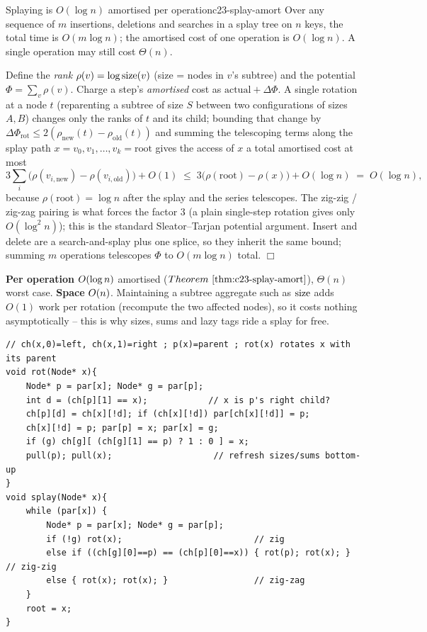 \begin{theorem}{Splaying is \(O(\log n)\) amortised per operation}{c23-splay-amort}
Over any sequence of \(m\) insertions, deletions and searches in a splay tree on
\(n\) keys, the total time is \(O(m\log n)\); the amortised cost of one operation
is \(O(\log n)\). A single operation may still cost \(\Theta(n)\).
\end{theorem}
\begin{proofbox}
Define the \emph{rank} \(\rho(v)=\log \operatorname{size}(v)\) (size = nodes in \(v\)'s subtree)
and the potential \(\Phi=\sum_{v}\rho(v)\). Charge a step's \emph{amortised} cost as
\(\text{actual} + \Delta\Phi\). A single rotation at a node \(t\) (reparenting a
subtree of size \(S\) between two configurations of sizes \(A,B\)) changes only the
ranks of \(t\) and its child; bounding that change by \(\Delta\Phi_{\text{rot}}\le
2(\rho_{\text{new}}(t)-\rho_{\text{old}}(t))\) and summing the telescoping terms
along the splay path \(x=v_0,v_1,\dots,v_k=\text{root}\) gives the access of \(x\) a
total amortised cost at most
\[
  3\sum_{i}\bigl(\rho(v_{i,\text{new}})-\rho(v_{i,\text{old}})\bigr) + O(1)
  \;\le\; 3\bigl(\rho(\text{root})-\rho(x)\bigr) + O(\log n) \;=\; O(\log n),
\]
because \(\rho(\text{root})=\log n\) after the splay and the series telescopes. The
zig-zig / zig-zag pairing is what forces the factor \(3\) (a plain single-step
rotation gives only \(O(\log^2 n)\)); this is the standard Sleator--Tarjan
potential argument. Insert and delete are a search-and-splay plus one splice, so
they inherit the same bound; summing \(m\) operations telescopes \(\Phi\) to
\(O(m\log n)\) total. \(\Box\)
\end{proofbox}

\begin{complexitybox}
\textbf{Per operation} \(O(\log n)\) amortised (\(\thmref{c23-splay-amort}\)),
\(\Theta(n)\) worst case. \textbf{Space} \(O(n)\). Maintaining a subtree
aggregate such as \(\operatorname{size}\) adds \(O(1)\) work per rotation (recompute the two
affected nodes), so it costs nothing asymptotically -- this is why sizes, sums and
lazy tags ride a splay for free.
\end{complexitybox}

\begin{lstlisting}[caption={Bottom-up splay: rotate x up two levels at a time. grand(x) is x's grandparent; the zig-zig vs zig-zag split is the whole art. Assumes parent pointers. ASCII only}, label={lst:c23-splay-rot}]
// ch(x,0)=left, ch(x,1)=right ; p(x)=parent ; rot(x) rotates x with its parent
void rot(Node* x){
    Node* p = par[x]; Node* g = par[p];
    int d = (ch[p][1] == x);            // x is p's right child?
    ch[p][d] = ch[x][!d]; if (ch[x][!d]) par[ch[x][!d]] = p;
    ch[x][!d] = p; par[p] = x; par[x] = g;
    if (g) ch[g][ (ch[g][1] == p) ? 1 : 0 ] = x;
    pull(p); pull(x);                    // refresh sizes/sums bottom-up
}
void splay(Node* x){
    while (par[x]) {
        Node* p = par[x]; Node* g = par[p];
        if (!g) rot(x);                          // zig
        else if ((ch[g][0]==p) == (ch[p][0]==x)) { rot(p); rot(x); }  // zig-zig
        else { rot(x); rot(x); }                 // zig-zag
    }
    root = x;
}
\end{lstlisting}

